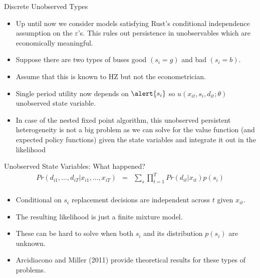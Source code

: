 \documentclass[xcolor=pdftex,dvipsnames,table,mathserif,aspectratio=169]{beamer}
\begin{document}
\begin{frame}{Discrete Unobserved Types}
\begin{itemize}
\item Up until now we consider models satisfying Rust's \alert{conditional independence} assumption on the $\varepsilon$'s. This rules out persistence in unobservables which are economically meaningful.
\item Suppose there are two types of buses good $(s_i=g)$ and bad $(s_i=b)$.
\item Assume that this is known to HZ but not the econometrician.
\item Single period utility now depends on $\alert{s_i}$ so $u(x_{it},s_i,d_{it}; \theta)$ \alert{unobserved state variable}.
\item In case of the nested fixed point algorithm, this unobserved persistent heterogeneity is not a big problem as we can solve for the value function (and expected policy functions) given the state variables and \alert{integrate it out} in the likelihood
\end{itemize}
\end{frame}



\begin{frame}{Unobserved State Variables: What happened?}
\begin{eqnarray*}
Pr(d_{i1},\ldots,d_{iT} | x_{i1},\ldots,x_{iT} ) &=& \sum_{s}  \prod_{t=1}^T Pr(d_{it} | x_{it} )  p(s_i) \\
\end{eqnarray*}
\begin{itemize}
\item \alert{Conditional on $s_i$ replacement decisions are independent across $t$ given $x_{it}$}.
\item The resulting likelihood is just a \alert{finite mixture model}.
\item These can be hard to solve when both $s_i$ and its distribution $p(s_i)$ are unknown.
\item Arcidiacono and Miller (2011) provide theoretical results for these types of problems.
\end{itemize}
\end{frame}
\end{document}
